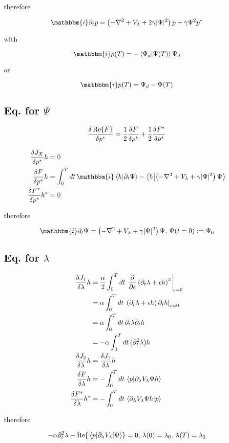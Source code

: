\documentclass[10pt,a4paper]{article}
\newcommand{\iu}{\ensuremath{\mathbbm{i}}}
\newcommand{\intT}{\ensuremath{\int_0^T dt\,}}
\begin{document}
therefore

\begin{equation}
\iu \partial_t p = \left( -\laplacian + V_{\lambda} + 2 \gamma \vert \Psi \vert^2 \right) p + \gamma \Psi^2 p^*
\end{equation}

with 

\begin{equation}
\iu p(T) = -\braket{\Psi_d}{\Psi(T)} \Psi_d
\end{equation}

or

\begin{equation}
\iu p(T) = \Psi_d - \Psi(T)
\end{equation}

\subsection{Eq. for $\Psi$}

\begin{equation}
\fdv{\Re{F}}{p^*} = \frac{1}{2} \fdv{F}{p^*} + \frac{1}{2} \fdv{F^*}{p^*}
\end{equation}

\begin{align}
\fdv{J_X}{p^*} h &= 0 \\
\fdv{F}{p^*} h &= \intT \iu \braket{h}{\partial_t\Psi} - \braket{h}{\left( -\laplacian + V_{\lambda} + \gamma \vert \Psi \vert^2 \right)\Psi} \\
\fdv{F^*}{p^*} h^* &= 0
\end{align}

therefore

\begin{equation}
\iu \partial_t\Psi = \left( -\laplacian + V_{\lambda} + \gamma \vert \Psi \vert^2 \right)\Psi, \, \Psi(t=0):=\Psi_0
\end{equation}


\subsection{Eq. for $\lambda$}

\begin{align}
\fdv{J_1}{\lambda} h &= \frac{\alpha}{2} \intT \left. \pdv{\epsilon} \left( \partial_t \lambda + \epsilon h \right)^2 \right\vert_{\epsilon=0} \\ 
&= \alpha \intT \left. \left( \partial_t \lambda + \epsilon h \right) \partial_t h \right\vert_{\epsilon=0} \\
&= \alpha \intT \partial_t \lambda \partial_t h \\ 
&= -\alpha \intT (\partial_t^2 \lambda ) h\\
\fdv{J_2}{\lambda} h &= \fdv{J_1}{\lambda} h\\
\fdv{F}{\lambda} h &= -\intT \braket{p}{\partial_{\lambda} V_{\lambda} \Psi h}  \\
\fdv{F^*}{\lambda} h^* &= -\intT \braket{\partial_{\lambda} V_{\lambda} \Psi h}{p}
\end{align}

therefore 

\begin{equation}
-\alpha \partial_t^2 \lambda - \Re{\mel{p}{\partial_{\lambda} V_{\lambda}}{\Psi}} = 0, \, \lambda(0)=\lambda_0, \, \lambda(T)=\lambda_1
\end{equation}
\end{document}

